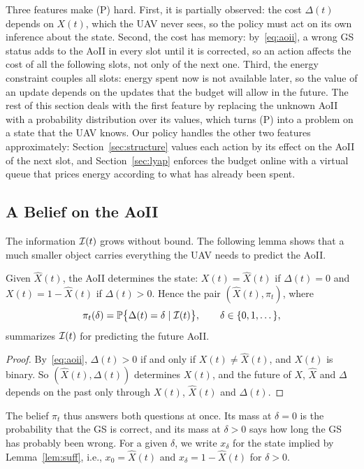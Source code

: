 Three features make (P) hard. First, it is partially observed: the cost $\Delta(t)$ depends on $X(t)$, which the UAV never sees, so the policy must act on its own inference about the state. Second, the cost has memory: by~\eqref{eq:aoii}, a wrong GS status adds to the AoII in every slot until it is corrected, so an action affects the cost of all the following slots, not only of the next one. Third, the energy constraint couples all slots: energy spent now is not available later, so the value of an update depends on the updates that the budget will allow in the future. The rest of this section deals with the first feature by replacing the unknown AoII with a probability distribution over its values, which turns (P) into a problem on a state that the UAV knows. Our policy handles the other two features approximately: Section~\ref{sec:structure} values each action by its effect on the AoII of the next slot, and Section~\ref{sec:lyap} enforces the budget online with a virtual queue that prices energy according to what has already been spent.

\subsection{A Belief on the AoII}\label{sec:belief}
The information $\mathcal{I}(t)$ grows without bound. The following lemma shows that a much smaller object carries everything the UAV needs to predict the AoII.

\begin{lemma}\label{lem:suff}
Given $\hat X(t)$, the AoII determines the state: $X(t)=\hat X(t)$ if $\Delta(t)=0$ and $X(t)=1-\hat X(t)$ if $\Delta(t)>0$. Hence the pair $(\hat X(t),\pi_t)$, where
\begin{equation}\label{eq:belief}
\pi_t(\delta)=\mathbb{P}\big\{\Delta(t)=\delta\mid\mathcal{I}(t)\big\},\qquad\delta\in\{0,1,\dots\},
\end{equation}
summarizes $\mathcal{I}(t)$ for predicting the future AoII.
\end{lemma}
\begin{proof}
By~\eqref{eq:aoii}, $\Delta(t)>0$ if and only if $X(t)\neq\hat X(t)$, and $X(t)$ is binary. So $(\hat X(t),\Delta(t))$ determines $X(t)$, and the future of $X$, $\hat X$ and $\Delta$ depends on the past only through $X(t)$, $\hat X(t)$ and $\Delta(t)$.
\end{proof}

The belief $\pi_t$ thus answers both questions at once. Its mass at $\delta=0$ is the probability that the GS is correct, and its mass at $\delta>0$ says how long the GS has probably been wrong. For a given $\delta$, we write $x_\delta$ for the state implied by Lemma~\ref{lem:suff}, i.e., $x_0=\hat X(t)$ and $x_\delta=1-\hat X(t)$ for $\delta>0$.

